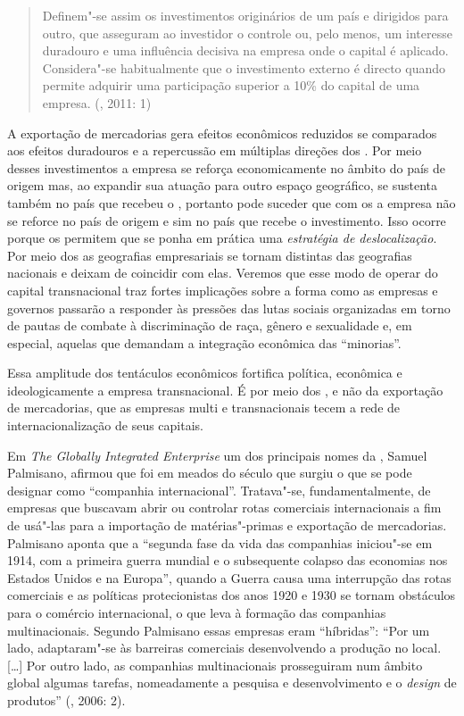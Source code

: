 \begin{quote}
Definem"-se assim os investimentos originários de um país e dirigidos
para outro, que asseguram ao investidor o controle ou, pelo menos, um
interesse duradouro e uma influência decisiva na empresa onde o capital
é aplicado. Considera"-se habitualmente que o investimento externo é
directo quando permite adquirir uma participação superior a 10\% do
capital de uma empresa. (, 2011: 1)
\end{quote}

A exportação de mercadorias gera efeitos econômicos reduzidos se
comparados aos efeitos duradouros e a repercussão em múltiplas direções
dos . Por meio desses investimentos a empresa se reforça
economicamente no âmbito do país de origem mas, ao expandir sua atuação
para outro espaço geográfico, se sustenta também no país que recebeu o
, portanto pode suceder que com os  a empresa não se reforce no
país de origem e sim no país que recebe o investimento. Isso ocorre
porque os  permitem que se ponha em prática uma \emph{estratégia de
deslocalização}. Por meio dos  as geografias empresariais se tornam
distintas das geografias nacionais e deixam de coincidir com elas.
Veremos que esse modo de operar do capital transnacional traz fortes
implicações sobre a forma como as empresas e governos passarão a
responder às pressões das lutas sociais organizadas em torno de pautas
de combate à discriminação de raça, gênero e sexualidade e, em especial,
aquelas que demandam a integração econômica das ``minorias''.

Essa amplitude dos tentáculos econômicos fortifica política, econômica e
ideologicamente a empresa transnacional. É por meio dos , e não da
exportação de mercadorias, que as empresas multi e transnacionais tecem
a rede de internacionalização de seus capitais.

Em \emph{The Globally Integrated Enterprise} um dos principais nomes da
, Samuel Palmisano, afirmou que foi em meados do século  que
surgiu o que se pode designar como ``companhia internacional''.
Tratava"-se, fundamentalmente, de empresas que buscavam abrir ou
controlar rotas comerciais internacionais a fim de usá"-las para a
importação de matérias"-primas e exportação de mercadorias. Palmisano
aponta que a ``segunda fase da vida das companhias iniciou"-se em 1914,
com a primeira guerra mundial e o subsequente colapso das economias nos
Estados Unidos e na Europa'', quando a Guerra causa uma interrupção das
rotas comerciais e as políticas protecionistas dos anos 1920 e 1930 se
tornam obstáculos para o comércio internacional, o que leva à formação
das companhias multinacionais. Segundo Palmisano essas empresas eram
``híbridas'': ``Por um lado, adaptaram"-se às barreiras comerciais
desenvolvendo a produção no local. {[}\ldots{}{]} Por outro lado, as
companhias multinacionais prosseguiram num âmbito global algumas
tarefas, nomeadamente a pesquisa e desenvolvimento e o \emph{design} de
produtos'' (, 2006: 2).

